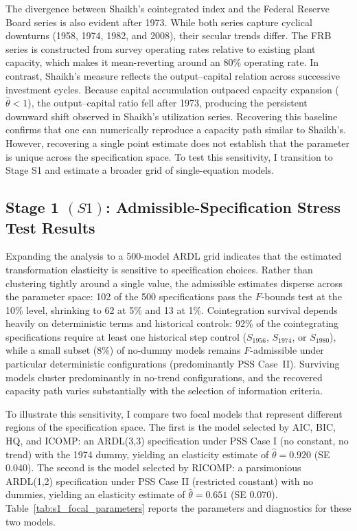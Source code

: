 The divergence between Shaikh's cointegrated index and the Federal Reserve Board series is also evident after 1973. While both series capture cyclical downturns (1958, 1974, 1982, and 2008), their secular trends differ. The FRB series is constructed from survey operating rates relative to existing plant capacity, which makes it mean-reverting around an 80\% operating rate. In contrast, Shaikh's measure reflects the output--capital relation across successive investment cycles. Because capital accumulation outpaced capacity expansion ($\hat{\theta} < 1$), the output--capital ratio fell after 1973, producing the persistent downward shift observed in Shaikh's utilization series. Recovering this baseline confirms that one can numerically reproduce a capacity path similar to Shaikh's. However, recovering a single point estimate does not establish that the parameter is unique across the specification space. To test this sensitivity, I transition to Stage S1 and estimate a broader grid of single-equation models.

\subsection{Stage 1 \texorpdfstring{$(S1)$}{}: Admissible-Specification Stress Test Results}
\label{subsec:S1_admissible_spec_new}

Expanding the analysis to a 500-model ARDL grid indicates that the estimated transformation elasticity is sensitive to specification choices. Rather than clustering tightly around a single value, the admissible estimates disperse across the parameter space: 102 of the 500 specifications pass the $F$-bounds test at the 10\% level, shrinking to 62 at 5\% and 13 at 1\%. Cointegration survival depends heavily on deterministic terms and historical controls: 92\% of the cointegrating specifications require at least one historical step control ($S_{1956}$, $S_{1974}$, or $S_{1980}$), while a small subset (8\%) of no-dummy models remains $F$-admissible under particular deterministic configurations (predominantly PSS Case~II). Surviving models cluster predominantly in no-trend configurations, and the recovered capacity path varies substantially with the selection of information criteria.

To illustrate this sensitivity, I compare two focal models that represent different regions of the specification space. The first is the model selected by AIC, BIC, HQ, and ICOMP: an ARDL(3,3) specification under PSS Case I (no constant, no trend) with the 1974 dummy, yielding an elasticity estimate of $\hat{\theta} = 0.920$ (SE 0.040). The second is the model selected by RICOMP: a parsimonious ARDL(1,2) specification under PSS Case II (restricted constant) with no dummies, yielding an elasticity estimate of $\hat{\theta} = 0.651$ (SE 0.070). Table~\ref{tab:s1_focal_parameters} reports the parameters and diagnostics for these two models.

